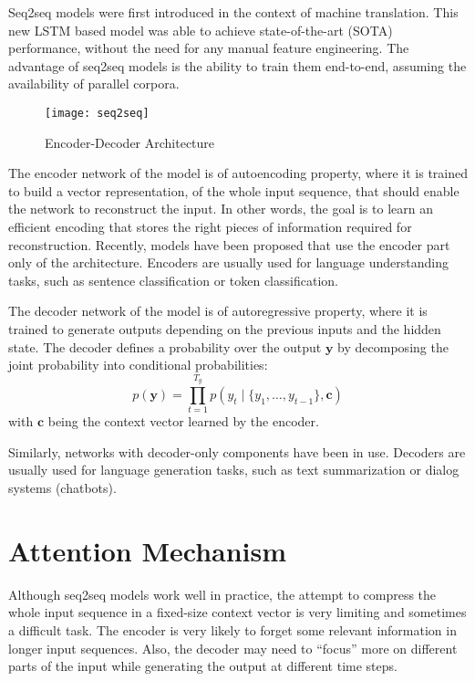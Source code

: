 Seq2seq models were first introduced \citep{sutskever2014sequence} in the context of machine translation. This new LSTM based model was able to achieve state-of-the-art (SOTA) performance, without the need for any manual feature engineering. The advantage of seq2seq models is the ability to train them end-to-end, assuming the availability of parallel corpora.

\begin{figure}[ht]
\centering
\texttt{[image: seq2seq]}
\caption{Encoder-Decoder Architecture \protect\footnotemark}
\label{fig:seq2seq}
\end{figure}

The encoder network of the model is of autoencoding property, where it is trained to build a vector representation, of the whole input sequence, that should enable the network to reconstruct the input. In other words, the goal is to learn an efficient encoding that stores the right pieces of information required for reconstruction. Recently, models have been proposed that use the encoder part only of the architecture. Encoders are usually used for language understanding tasks, such as sentence classification or token classification.

The decoder network of the model is of autoregressive property, where it is trained to generate outputs depending on the previous inputs and the hidden state. The decoder defines a probability over the output $\mathbf{y}$ by decomposing the joint probability into conditional probabilities:
\[ p(\mathbf{y}) = \prod_{t=1}^{T_y}  p(y_t \mid \{y_1, \ldots, y_{t-1}\}, \mathbf{c}) \]
with $\mathbf{c}$ being the context vector learned by the encoder.

Similarly, networks with decoder-only components have been in use. Decoders are usually used for language generation tasks, such as text summarization or dialog systems (chatbots).



\section{Attention Mechanism}
\label{sec:attention}

Although seq2seq models work well in practice, the attempt to compress the whole input sequence in a fixed-size context vector is very limiting and sometimes a difficult task. The encoder is very likely to forget some relevant information in longer input sequences. Also, the decoder may need to ``focus'' more on different parts of the input while generating the output at different time steps.

